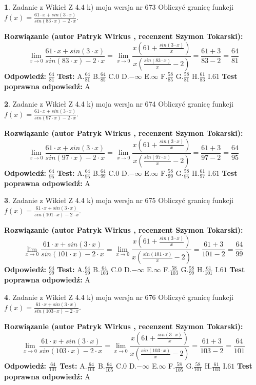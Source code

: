 \documentclass[12pt, a4paper]{article}
\theoremstyle{definition} %
\newtheorem{zad}{}
\newcommand{\zadStart}[1]{\begin{zad}#1\newline}
\newcommand{\zadStop}{\end{zad}}
\newcommand{\rozwStart}[2]{\noindent \textbf{Rozwiązanie (autor #1 , recenzent #2): }\newline}
\newcommand{\rozwStop}{\newline}
\newcommand{\odpStart}{\noindent \textbf{Odpowiedź:}\newline}
\newcommand{\odpStop}{\newline}
\newcommand{\testStart}{\noindent \textbf{Test:}\newline}
\newcommand{\testStop}{\newline}
\newcommand{\kluczStart}{\noindent \textbf{Test poprawna odpowiedź:}\newline}
\newcommand{\kluczStop}{\newline}
\begin{document}
\zadStart{Zadanie z Wikieł Z 4.4 k) moja wersja nr 673}
Obliczyć granicę funkcji $f(x)=\frac{61\cdot x +sin(3\cdot x)}{sin(83\cdot x) -2\cdot x}$.
\zadStop
\rozwStart{Patryk Wirkus}{Szymon Tokarski}
$$\lim\limits_{x\to 0}\frac{61\cdot x +sin(3\cdot x)}{sin(83\cdot x) -2\cdot x}
=\lim\limits_{x\to 0}\frac{x(61+\frac{sin(3\cdot x)}{x})}{x(\frac{sin(83\cdot x)}{x}-2)}
=\frac{61+3}{83-2} = \frac{64}{81}$$
\rozwStop
\odpStart
$\frac{64}{81}$
\odpStop
\testStart
A.$\frac{64}{81}$
B.$\frac{64}{85}$
C.$0$
D.$-\infty$
E.$\infty$
F.$\frac{58}{85}$
G.$\frac{58}{81}$
H.$\frac{61}{83}$
I.$61$
\testStop
\kluczStart
A
\kluczStop



\zadStart{Zadanie z Wikieł Z 4.4 k) moja wersja nr 674}
Obliczyć granicę funkcji $f(x)=\frac{61\cdot x +sin(3\cdot x)}{sin(97\cdot x) -2\cdot x}$.
\zadStop
\rozwStart{Patryk Wirkus}{Szymon Tokarski}
$$\lim\limits_{x\to 0}\frac{61\cdot x +sin(3\cdot x)}{sin(97\cdot x) -2\cdot x}
=\lim\limits_{x\to 0}\frac{x(61+\frac{sin(3\cdot x)}{x})}{x(\frac{sin(97\cdot x)}{x}-2)}
=\frac{61+3}{97-2} = \frac{64}{95}$$
\rozwStop
\odpStart
$\frac{64}{95}$
\odpStop
\testStart
A.$\frac{64}{95}$
B.$\frac{64}{99}$
C.$0$
D.$-\infty$
E.$\infty$
F.$\frac{58}{99}$
G.$\frac{58}{95}$
H.$\frac{61}{97}$
I.$61$
\testStop
\kluczStart
A
\kluczStop



\zadStart{Zadanie z Wikieł Z 4.4 k) moja wersja nr 675}
Obliczyć granicę funkcji $f(x)=\frac{61\cdot x +sin(3\cdot x)}{sin(101\cdot x) -2\cdot x}$.
\zadStop
\rozwStart{Patryk Wirkus}{Szymon Tokarski}
$$\lim\limits_{x\to 0}\frac{61\cdot x +sin(3\cdot x)}{sin(101\cdot x) -2\cdot x}
=\lim\limits_{x\to 0}\frac{x(61+\frac{sin(3\cdot x)}{x})}{x(\frac{sin(101\cdot x)}{x}-2)}
=\frac{61+3}{101-2} = \frac{64}{99}$$
\rozwStop
\odpStart
$\frac{64}{99}$
\odpStop
\testStart
A.$\frac{64}{99}$
B.$\frac{64}{103}$
C.$0$
D.$-\infty$
E.$\infty$
F.$\frac{58}{103}$
G.$\frac{58}{99}$
H.$\frac{61}{101}$
I.$61$
\testStop
\kluczStart
A
\kluczStop



\zadStart{Zadanie z Wikieł Z 4.4 k) moja wersja nr 676}
Obliczyć granicę funkcji $f(x)=\frac{61\cdot x +sin(3\cdot x)}{sin(103\cdot x) -2\cdot x}$.
\zadStop
\rozwStart{Patryk Wirkus}{Szymon Tokarski}
$$\lim\limits_{x\to 0}\frac{61\cdot x +sin(3\cdot x)}{sin(103\cdot x) -2\cdot x}
=\lim\limits_{x\to 0}\frac{x(61+\frac{sin(3\cdot x)}{x})}{x(\frac{sin(103\cdot x)}{x}-2)}
=\frac{61+3}{103-2} = \frac{64}{101}$$
\rozwStop
\odpStart
$\frac{64}{101}$
\odpStop
\testStart
A.$\frac{64}{101}$
B.$\frac{64}{105}$
C.$0$
D.$-\infty$
E.$\infty$
F.$\frac{58}{105}$
G.$\frac{58}{101}$
H.$\frac{61}{103}$
I.$61$
\testStop
\kluczStart
A
\kluczStop
\end{document}

